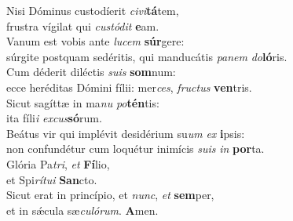 \evenverse Nisi Dóminus custodíerit \textit{ci}\textit{vi}\textbf{tá}tem,~\*\\
\evenverse frustra vígilat qui \textit{cu}\textit{stó}\textit{dit} \textbf{e}am.\\
\oddverse Vanum est vobis ante \textit{lu}\textit{cem} \textbf{súr}gere:~\*\\
\oddverse súrgite postquam sedéritis, qui manducátis \textit{pa}\textit{nem} \textit{do}\textbf{ló}ris.\\
\evenverse Cum déderit diléctis \textit{su}\textit{is} \textbf{som}num:~\*\\
\evenverse ecce heréditas Dómini fílii: mer\textit{ces}, \textit{fru}\textit{ctus} \textbf{ven}tris.\\
\oddverse Sicut sagíttæ in ma\textit{nu} \textit{po}\textbf{tén}tis:~\*\\
\oddverse ita fíli\textit{i} \textit{ex}\textit{cus}\textbf{só}rum.\\
\evenverse Beátus vir qui implévit desidérium su\textit{um} \textit{ex} \textbf{i}psis:~\*\\
\evenverse non confundétur cum loquétur inimícis \textit{su}\textit{is} \textit{in} \textbf{por}ta.\\
\oddverse Glória Pa\textit{tri}, \textit{et} \textbf{Fí}lio,~\*\\
\oddverse et Spi\textit{rí}\textit{tu}\textit{i} \textbf{San}cto.\\
\evenverse Sicut erat in princípio, et \textit{nunc}, \textit{et} \textbf{sem}per,~\*\\
\evenverse et in sǽcula sæ\textit{cu}\textit{ló}\textit{rum}. \textbf{A}men.\\

